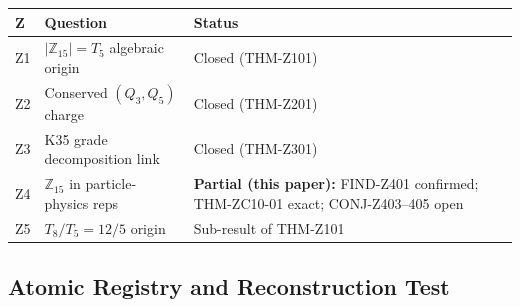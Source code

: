 \documentclass[12pt, a4paper]{article}
\begin{document}
\begin{derivedbox}[title={Z-Programme status after TASK-ZC10}]
{\small
\renewcommand{\arraystretch}{1.30}
\begin{tabular}{p{0.8cm} p{7.5cm} p{3.0cm}}
\toprule
\textbf{Z} & \textbf{Question} & \textbf{Status}\\
\midrule
Z1 & $|\mathbb{Z}_{15}| = T_5$ algebraic origin
  & Closed (THM-Z101) \\
Z2 & Conserved $(Q_3, Q_5)$ charge
  & Closed (THM-Z201) \\
Z3 & K35 grade decomposition link
  & Closed (THM-Z301) \\
Z4 & $\mathbb{Z}_{15}$ in particle-physics reps
  & \textbf{Partial (this paper):} FIND-Z401 confirmed;
    THM-ZC10-01 exact; CONJ-Z403--405 open \\
Z5 & $T_8/T_5 = 12/5$ origin
  & Sub-result of THM-Z101 \\
\bottomrule
\end{tabular}
}
\end{derivedbox}

\subsection{Atomic Registry and Reconstruction Test}
\label{sec:registry}
\end{document}
